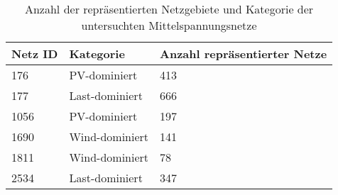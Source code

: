 {
\renewcommand{\arraystretch}{1.2}%
\begin{table}[H]
	\begin{center}
		\caption{Anzahl der repräsentierten Netzgebiete und Kategorie der untersuchten Mittelspannungsnetze}
		\begin{tabu} to \textwidth {X[1] X[1] X[1, r] }
			\hline
			Netz ID    & Kategorie      & Anzahl repräsentierter Netze \\ \hline
			\num{176}  & PV-dominiert   & \num{413}                    \\
			\num{177}  & Last-dominiert & \num{666}                    \\
			\num{1056} & PV-dominiert   & \num{197}                    \\
			\num{1690} & Wind-dominiert & \num{141}                    \\
			\num{1811} & Wind-dominiert & \num{78}                     \\
			\num{2534} & Last-dominiert & \num{347}                    \\ \hline
		\end{tabu}
		\label{tab:grid_IDs}
	\end{center}
	\vspace{-3mm}%
\end{table}
}